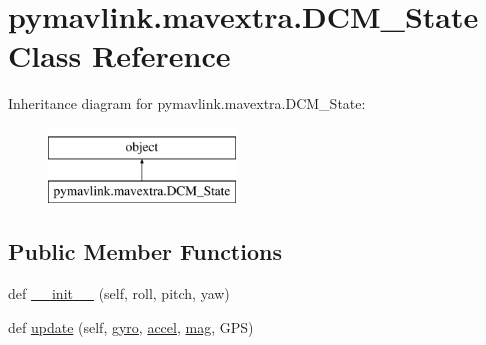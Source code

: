\hypertarget{classpymavlink_1_1mavextra_1_1DCM__State}{}\section{pymavlink.\+mavextra.\+D\+C\+M\+\_\+\+State Class Reference}
\label{classpymavlink_1_1mavextra_1_1DCM__State}
Inheritance diagram for pymavlink.\+mavextra.\+D\+C\+M\+\_\+\+State\+:\begin{figure}[H]
\begin{center}
\leavevmode
\includegraphics[height=2.000000cm]{classpymavlink_1_1mavextra_1_1DCM__State}
\end{center}
\end{figure}
\subsection*{Public Member Functions}
\begin{DoxyCompactItemize}
\item 
def \mbox{\hyperlink{classpymavlink_1_1mavextra_1_1DCM__State_a1f20ca8f9381120815f5cf1eff5d19ae}{\+\_\+\+\_\+init\+\_\+\+\_\+}} (self, roll, pitch, yaw)
\item 
def \mbox{\hyperlink{classpymavlink_1_1mavextra_1_1DCM__State_a1d4bde9feb6f1b8ca501f96c914bac27}{update}} (self, \mbox{\hyperlink{classpymavlink_1_1mavextra_1_1DCM__State_a811e975d99347cd0574347ca8fb82527}{gyro}}, \mbox{\hyperlink{classpymavlink_1_1mavextra_1_1DCM__State_af2a01ad15a9bbae4e42d7dfd4d34725f}{accel}}, \mbox{\hyperlink{classpymavlink_1_1mavextra_1_1DCM__State_a4d04b8ef6413c3ddfe3256b94fd4af40}{mag}}, G\+PS)
\end{DoxyCompactItemize}
